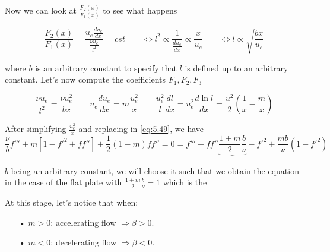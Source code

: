 			\begin{center}
			\end{center}
			
			Now we can look at $\frac{F_2(x)}{F_1(x)}$ to see what happens
			
			\begin{equation}
				\frac{F_2(x)}{F_1(x)} = \frac{u_e \frac{du_e}{dx}}{\frac{\nu u_e}{l^2}} = cst \qquad \Leftrightarrow l^2 \propto \frac{1}{\frac{du_e}{dx}} \propto \frac{x}{u_e} \qquad \Leftrightarrow l \propto \sqrt{\frac{bx}{u_e}}
			\end{equation}
			
			where $b$ is an arbitrary constant to specify that $l$ is defined up to an arbitrary constant. Let's now compute the coefficients $F_1, F_2, F_3$ 
			
			\begin{equation}
				\frac{\nu u_e }{l^2} = \frac{\nu u_e^2}{bx} \qquad u_e \frac{du_e}{dx} = m\frac{u_e^2}{x} \qquad \frac{u_e^2}{l}\frac{dl}{dx} = u_e^2\frac{d\ln l}{dx} = \frac{u^2}{2} \left( \frac{1}{x} - \frac{m}{x} \right)
			\end{equation}
			
			After simplifying $\frac{u_e^2}{x}$ and replacing in \eqref{eq:5.49}, we have 
			\begin{equation}
				\frac{\nu}{b} f''' + m \left[1 - f'^2 + ff'' \right] + \frac{1}{2} ( 1 - m ) ff'' = 0 = f''' + ff'' \underbrace{\frac{1+m}{2} \frac{b}{\nu}} - f'^2 + \frac{mb}{\nu} (1-f'^2) 
			\end{equation}
			
			$b$ being an arbitrary constant, we will choose it such that we obtain the equation in the case of the flat plate with $\frac{1+m}{2} \frac{b}{\nu} = 1$ which is the 
			
			\begin{center}
			\end{center}
			
			At this stage, let's notice that when: 
			\begin{itemize}
				\item[•] $m>0$: accelerating flow $\Rightarrow \beta > 0$.
				\item[•] $m<0$: decelerating flow $\Rightarrow \beta < 0$.
			\end{itemize}
			
